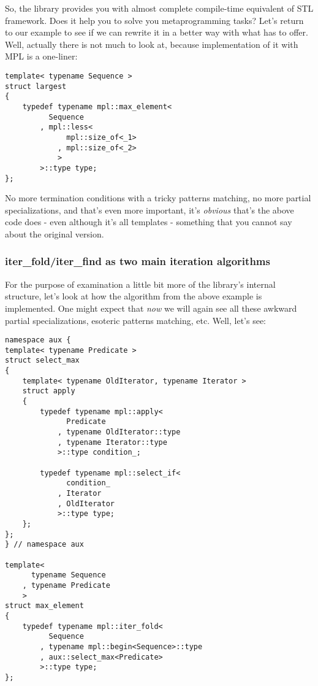 \documentclass{kapproc}
\begin{document}
So, the library provides you with almost complete compile-time 
equivalent of STL framework. Does it help you to solve you 
metaprogramming tasks? Let's return to our  
example to see if we can rewrite it in a better way with what 
 has to offer. Well, actually there is not 
much to look at, because implementation of it with MPL is a 
one-liner:

{\small
\begin{codesamp}\begin{verbatim}
template< typename Sequence >
struct largest
{
    typedef typename mpl::max_element<
          Sequence
        , mpl::less<
              mpl::size_of<_1>
            , mpl::size_of<_2>
            >
        >::type type;
};
\end{verbatim}
\end{codesamp}
}

No more termination conditions with a tricky patterns matching, 
no more partial specializations, and that's even more important, 
it's \emph{obvious} that's the above code does - even although 
it's all templates - something that you cannot say about the 
original version.

\subsubsection{iter\_fold/iter\_find as two main iteration 
algorithms}

For the purpose of examination a little bit more of the 
library's internal structure, let's look at how the 
 algorithm from the above example is 
implemented. One might expect that \emph{now} we will again 
see all these awkward partial specializations, esoteric 
patterns matching, etc. Well, let's see:

{\small
\begin{codesamp}\begin{verbatim}
namespace aux {
template< typename Predicate >
struct select_max
{
    template< typename OldIterator, typename Iterator >
    struct apply
    {
        typedef typename mpl::apply<
              Predicate
            , typename OldIterator::type
            , typename Iterator::type
            >::type condition_;

        typedef typename mpl::select_if<
              condition_
            , Iterator
            , OldIterator
            >::type type;
    };
};
} // namespace aux 

template<
      typename Sequence
    , typename Predicate
    >
struct max_element
{
    typedef typename mpl::iter_fold<    
          Sequence
        , typename mpl::begin<Sequence>::type
        , aux::select_max<Predicate>
        >::type type;
};
\end{verbatim}
\end{codesamp}
}
\end{document}
